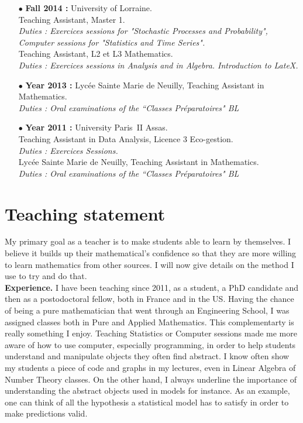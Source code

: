 \documentclass[a4paper]{article}
\begin{document}
\begin{itemize}
\item[$\bullet$] \textbf{ Fall 2014 :}  University of Lorraine.\\
					Teaching Assistant, Master 1. \\
					\textit{Duties : Exercices sessions for "Stochastic Processes and Probability", Computer sessions for "Statistics and Time Series".}\\
					Teaching Assistant, L2 et L3 Mathematics. \\
					\textit{Duties : Exercices sessions in Analysis and in Algebra. Introduction to LateX.}\\
\item[$\bullet$] \textbf{ Year 2013 :} Lycée Sainte Marie de Neuilly, Teaching Assistant in Mathematics. \\
					\textit{Duties : Oral examinations of the ``Classes Préparatoires" BL} \\
\item[$\bullet$] \textbf{ Year 2011 :} University Paris~II Assas.\\
					Teaching Assistant in Data Analysis, Licence 3 Eco-gestion.\\
					\textit{Duties : Exercices Sessions.}\\
					Lycée Sainte Marie de Neuilly, Teaching Assistant in Mathematics. \\
					\textit{Duties : Oral examinations of the ``Classes Préparatoires" BL} 
\end{itemize}

\newpage

\section{Teaching statement}

My primary goal as a teacher is to make students able to learn by themselves. I believe it builds up their mathematical’s confidence so that they are more willing to learn mathematics from other sources. I will now give details  on the method I use to try and do that.\\

\textbf{Experience.} I have been teaching since 2011, as a student, a PhD candidate and then as a postodoctoral fellow, both in France and in the US. Having the chance of being a pure mathematician that went through an Engineering School, I was assigned classes both in Pure and Applied Mathematics. This complementarty is really something I enjoy. Teaching Statistics or Computer sessions made me more aware of how to use computer, especially programming, in order to help students understand and manipulate objects they often find abstract. I know often show my students a piece of code and graphs in my lectures, even in Linear Algebra of Number Theory classes. On the other hand, I always underline the importance of understanding the abstract objects used in models for instance. As an example, one can think of all the hypothesis a statistical model has to satisfy in order to make predictions valid.\\
\end{document}
